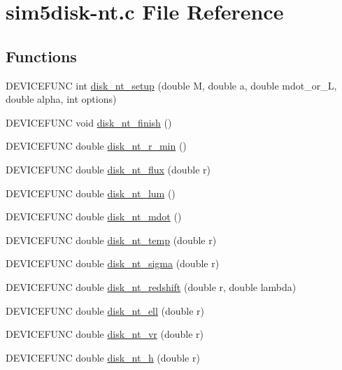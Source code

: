 \hypertarget{sim5disk-nt_8c}{}\section{sim5disk-\/nt.c File Reference}
\label{sim5disk-nt_8c}
\subsection*{Functions}
\begin{DoxyCompactItemize}
\item 
D\+E\+V\+I\+C\+E\+F\+U\+NC int \hyperlink{sim5disk-nt_8c_a0d21c45c6cae4ab611409f661d6031e4}{disk\+\_\+nt\+\_\+setup} (double M, double a, double mdot\+\_\+or\+\_\+L, double alpha, int options)
\item 
D\+E\+V\+I\+C\+E\+F\+U\+NC void \hyperlink{sim5disk-nt_8c_a27159e5846914b6f75ed1a4bbad03cea}{disk\+\_\+nt\+\_\+finish} ()
\item 
D\+E\+V\+I\+C\+E\+F\+U\+NC double \hyperlink{sim5disk-nt_8c_a8922cee7769517cf6984134ad8caa0b6}{disk\+\_\+nt\+\_\+r\+\_\+min} ()
\item 
D\+E\+V\+I\+C\+E\+F\+U\+NC double \hyperlink{sim5disk-nt_8c_a1ad909d4e1c2190fe59faddc3767b475}{disk\+\_\+nt\+\_\+flux} (double r)
\item 
D\+E\+V\+I\+C\+E\+F\+U\+NC double \hyperlink{sim5disk-nt_8c_a9f4d9802a8c4133589b71066d45086de}{disk\+\_\+nt\+\_\+lum} ()
\item 
D\+E\+V\+I\+C\+E\+F\+U\+NC double \hyperlink{sim5disk-nt_8c_a5886e0305745277c267ce2c160973d0b}{disk\+\_\+nt\+\_\+mdot} ()
\item 
D\+E\+V\+I\+C\+E\+F\+U\+NC double \hyperlink{sim5disk-nt_8c_ad4926b8b12d935681a2ed24cba8d9380}{disk\+\_\+nt\+\_\+temp} (double r)
\item 
D\+E\+V\+I\+C\+E\+F\+U\+NC double \hyperlink{sim5disk-nt_8c_a9bf97ee42a093ec47af5d7381cb62e73}{disk\+\_\+nt\+\_\+sigma} (double r)
\item 
D\+E\+V\+I\+C\+E\+F\+U\+NC double \hyperlink{sim5disk-nt_8c_a2a1cdf30047160340c200afd110c0890}{disk\+\_\+nt\+\_\+redshift} (double r, double lambda)
\item 
D\+E\+V\+I\+C\+E\+F\+U\+NC double \hyperlink{sim5disk-nt_8c_a5334fc211402dd26b97d0c45f905b48e}{disk\+\_\+nt\+\_\+ell} (double r)
\item 
D\+E\+V\+I\+C\+E\+F\+U\+NC double \hyperlink{sim5disk-nt_8c_a9f37916b29db679c9e3484a6322eed34}{disk\+\_\+nt\+\_\+vr} (double r)
\item 
D\+E\+V\+I\+C\+E\+F\+U\+NC double \hyperlink{sim5disk-nt_8c_a9cd799d74b6b550d966e8a57447f1612}{disk\+\_\+nt\+\_\+h} (double r)

\end{DoxyCompactItemize}
